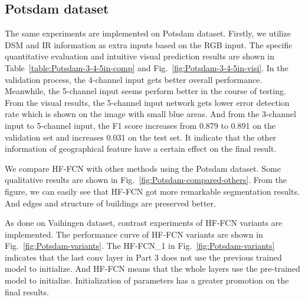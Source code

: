 \subsection{Potsdam dataset}
 The same experiments are implemented on Potsdam dataset. Firstly, we utilize DSM and IR information as extra inputs based on the RGB input. The specific quantitative evaluation and intuitive visual prediction results are shown in Table~\ref{table:Potsdam-3-4-5in-comp} and Fig.~\ref{fig:Potsdam-3-4-5in-visi}. In the validation process, the 4-channel input gets better overall performance. Meanwhile, the 5-channel input seems perform better in the course of testing. From the visual results, the 5-channel input network gets lower error detection rate which is shown on the image with small blue areas. And from the 3-channel input to 5-channel input, the F1 score increases from 0.879 to 0.891 on the validation set and increases 0.031 on the test set. It indicate that the other information of geographical feature have a certain effect on the final result.

 We compare HF-FCN with other methods using the Potsdam dataset. Some qualitative results are shown in Fig.~\ref{fig:Potsdam-compared-others}.
 From the figure, we can easily see that HF-FCN got more remarkable segmentation results. And edges and structure of buildings are preserved better.

 As done on Vaihingen dataset, contrast experiments of HF-FCN variants are implemented. The performance curve of HF-FCN variants are shown in Fig.~\ref{fig:Potsdam-variants}.
 The HF-FCN\_1 in Fig.~\ref{fig:Potsdam-variants} indicates that the last conv layer in Part 3 does not use the previous trained model to initialize. And HF-FCN means that the whole layers use the pre-trained model to initialize. Initialization of parameters has a greater promotion on the final results.

